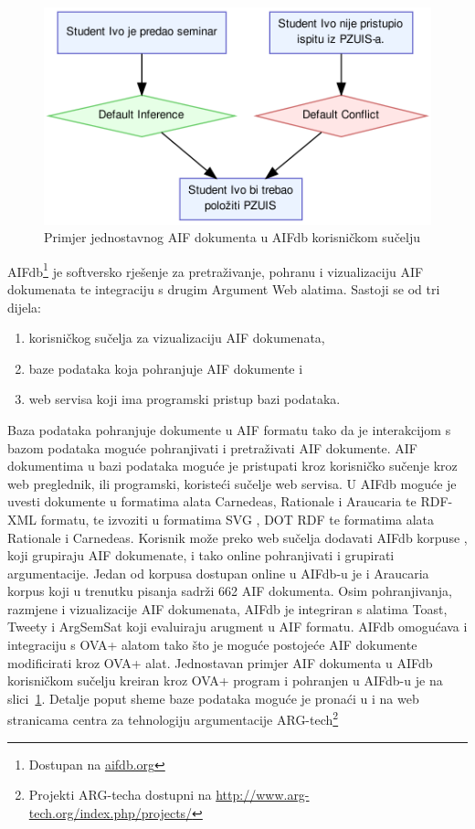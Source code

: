\begin{figure}
    \centering
    \includegraphics[scale=0.8]{aifdb_ex.png}
\caption{Primjer jednostavnog AIF dokumenta u AIFdb korisničkom sučelju}
\label{fig:aifdb_ex}
\end{figure}

AIFdb\footnote{Dostupan na \url{aifdb.org}} \citep{lawrence2012aifdb} 
je softversko rješenje za pretraživanje, pohranu i vizualizaciju AIF dokumenata te
integraciju s drugim Argument Web alatima. 
Sastoji se od tri dijela:
\begin{enumerate}
    \item korisničkog sučelja za vizualizaciju AIF dokumenata,
    \item baze podataka koja pohranjuje AIF dokumente i
    \item web servisa koji ima programski pristup bazi podataka.
\end{enumerate}
Baza podataka pohranjuje dokumente u AIF formatu tako da je 
interakcijom s bazom podataka moguće pohranjivati i pretraživati AIF dokumente. 
AIF dokumentima u bazi podataka moguće je pristupati kroz korisničko sučenje 
kroz web preglednik, ili programski, koristeći sučelje web servisa.  
U AIFdb moguće je uvesti  dokumente u formatima alata 
Carnedeas, Rationale i Araucaria te RDF-XML formatu, te izvoziti 
u formatima SVG , DOT 
RDF te formatima alata Rationale i Carnedeas. 
Korisnik može preko web sučelja dodavati AIFdb korpuse \citep{lawrence2014aifdb}, 
koji grupiraju AIF dokumenate, i tako online pohranjivati i grupirati argumentacije. 
Jedan od korpusa dostupan online u AIFdb-u je i Araucaria korpus koji 
u trenutku pisanja sadrži 662 AIF dokumenta. 
Osim pohranjivanja, razmjene i vizualizacije AIF dokumenata, AIFdb je integriran 
s alatima Toast, Tweety i ArgSemSat koji evaluiraju arugment u AIF formatu. 
AIFdb omogućava i integraciju s OVA+ alatom tako što je moguće postojeće 
AIF dokumente modificirati kroz OVA+ alat. 
Jednostavan primjer AIF dokumenta
u AIFdb korisničkom sučelju kreiran kroz OVA+ program i 
pohranjen u AIFdb-u je na slici~\ref{fig:aifdb_ex}. Detalje poput sheme 
baze podataka moguće je pronaći u \citep{lawrence2014aifdb} i na web stranicama
centra za tehnologiju argumentacije  
ARG-tech\footnote{Projekti ARG-techa dostupni na \url{http://www.arg-tech.org/index.php/projects/}}


%     



